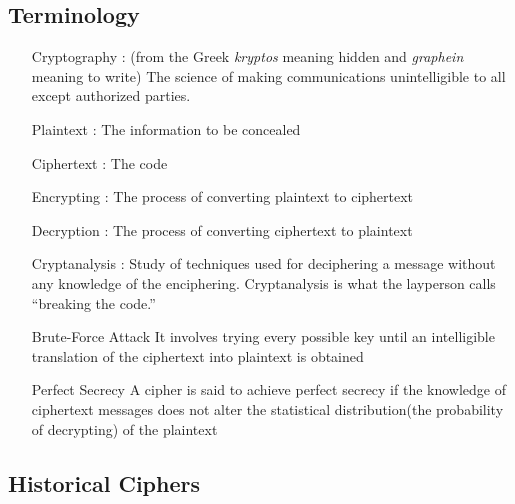 \documentclass{article}
\begin{document}
\subsection{Terminology}
\begin{itemize}
    \item[Cryptography]: (from the Greek {\it kryptos} meaning hidden and {\it graphein} meaning to write) The
    science of making communications unintelligible to all except authorized parties.
    \item[Plaintext]: The information to be concealed
    \item[Ciphertext]: The code
    \item[Encrypting]: The process of converting plaintext to ciphertext 
    \item[Decryption]: The process of converting ciphertext to plaintext
    \item[Cryptanalysis]: Study of techniques used for deciphering a message without any knowledge of the enciphering. Cryptanalysis is what the layperson calls “breaking the code.”
    \item[Brute-Force Attack] It involves trying every possible key until an intelligible translation of the ciphertext into plaintext is obtained
    \item[Perfect Secrecy] A cipher is said to achieve perfect secrecy if the knowledge of ciphertext messages does not alter the statistical distribution(the probability of decrypting) of the plaintext 
\end{itemize}

\subsection{Historical Ciphers}
\end{document}
